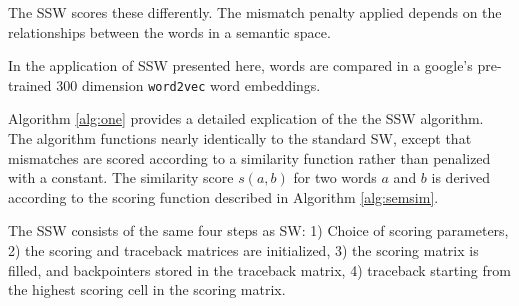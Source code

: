 {The SSW scores these differently. The mismatch penalty applied depends on the relationships between the words in a semantic space. 

In the application of SSW presented here, words are compared in a google's pre-trained 300 dimension \texttt{word2vec} word embeddings. 

Algorithm \ref{alg:one} provides a detailed explication of the the SSW algorithm. The algorithm functions nearly identically to the standard SW, except that mismatches are scored according to a similarity function rather than penalized with a constant. The similarity score $s(a,b)$ for two words $a$ and $b$ is derived according to the scoring function described in Algorithm \ref{alg:semsim}.

The SSW consists of the same four steps as SW: 1) Choice of scoring parameters, 2) the scoring and traceback matrices are initialized, 3) the scoring matrix is filled, and backpointers stored in the traceback matrix, 4) traceback starting from the highest scoring cell in the scoring matrix.



\begin{algorithm}[t]
\SetAlgoNoLine
{}


\end{algorithm}}
